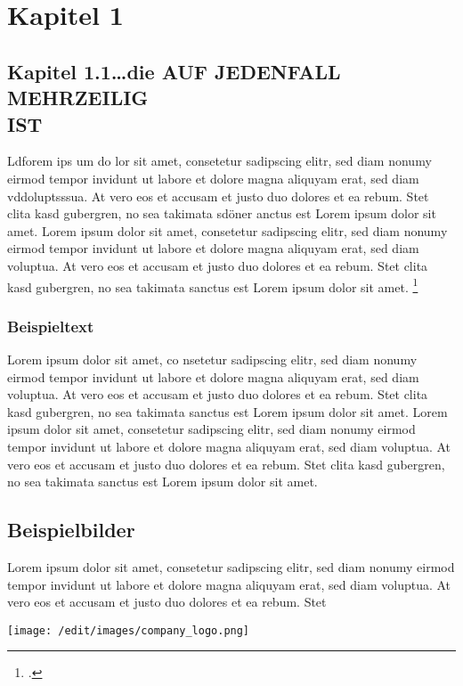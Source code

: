 \section{Kapitel 1}

\subsection{Kapitel 1.1\ldots die AUF JEDENFALL MEHRZEILIG\\IST}

Ldforem ips um do lor sit amet, consetetur sadipscing elitr, \label{Referenz}
sed diam  nonumy eirmod tempor invidunt ut labore et dolore magna aliquyam erat,
sed diam vddoluptsssua. At vero eos et accusam et justo duo dolores et ea rebum.
Stet clita kasd gubergren, no sea takimata sdöner anctus est Lorem ipsum dolor sit amet. Lorem ipsum dolor sit amet, consetetur sadipscing elitr, sed diam nonumy eirmod tempor invidunt ut labore et dolore magna aliquyam erat, sed diam voluptua. At vero eos et accusam et justo duo dolores et ea rebum. Stet clita kasd gubergren, no sea takimata sanctus est Lorem ipsum dolor sit amet.
\footcite[Vgl.][Experto.de, Artikel über das und jenes]{praxishandbuch:bpmn2}
\subsubsection{Beispieltext}
Lorem ipsum dolor sit amet, co nsetetur sadipscing elitr, sed diam
nonumy eirmod tempor invidunt ut labore et dolore magna aliquyam erat, sed diam voluptua. At vero eos et accusam et justo duo dolores et ea rebum. Stet clita kasd gubergren, no sea takimata sanctus est Lorem ipsum dolor sit amet. Lorem ipsum dolor sit amet, consetetur sadipscing elitr, sed diam nonumy eirmod tempor invidunt ut labore et dolore magna aliquyam erat, sed diam voluptua. At vero eos et accusam et justo duo dolores et ea rebum. Stet clita kasd gubergren, no sea takimata sanctus est Lorem ipsum dolor sit amet.

\clearpage

\subsection{Beispielbilder}
Lorem ipsum dolor sit amet, consetetur sadipscing elitr, sed diam nonumy eirmod tempor invidunt ut labore et dolore magna aliquyam erat, sed diam voluptua. At vero eos et accusam et justo duo dolores et ea rebum. Stet

\begin{center}
	\texttt{[image: /edit/images/company\_logo.png]}
\end{center}

